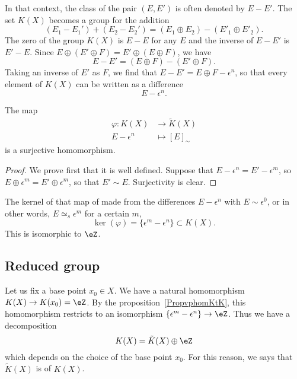 In that context, the class of the pair $(E,E')$ is often denoted by $E-E'$. The set $K(X)$ becomes a group for the addition
\begin{equation}
	(E_1-E_1')+(E_2-E_2')=(E_1\oplus E_2)-(E'_1\oplus E'_2).
\end{equation}
The zero of the group $K(X)$ is $E-E$ for any $E$ and the inverse of $E-E'$ is $E'-E$. Since $E\oplus(E'\oplus F)=E'\oplus(E\oplus F)$, we have
\begin{equation}
	E-E'=(E\oplus F)-(E'\oplus F).
\end{equation}
Taking an inverse of $E'$ as $F$, we find that $E-E'=E\oplus F-\epsilon^n$, so that every element of $K(X)$ can be written as a difference
\[
	E-\epsilon^n.
\]

\begin{proposition}		\label{PropvphomKtK}
	The map
	\begin{equation}
		\begin{aligned}
			\varphi\colon K(X) & \to \tilde K(X)    \\
			E-\epsilon^n       & \mapsto [E]_{\sim}
		\end{aligned}
	\end{equation}
	is a surjective homomorphism.
\end{proposition}

\begin{proof}
	We prove first that it is well defined. Suppose that $E-\epsilon^n=E'-\epsilon^m$, so $E\oplus \epsilon^m=E'\oplus \epsilon^m$, so that $E'\sim E$. Surjectivity is clear.
\end{proof}

The kernel of that map of made from the differences $E-\epsilon^n$ with $E\sim \epsilon^0$, or in other words, $E\simeq_s\epsilon^m$ for a certain $m$,
\begin{equation}
	\ker(\varphi)=\{ \epsilon^m-\epsilon^n \}\subset K(X).
\end{equation}
This is isomorphic to $\eZ$.

\subsection{Reduced group}

Let us fix a base point $x_0\in X$. We have a natural homomorphism $K(X)\to K(x_0)=\eZ$. By the proposition~\ref{PropvphomKtK}, this homomorphism restricts to an isomorphism $\{ \epsilon^m-\epsilon^n \}\to \eZ$. Thus we have a decomposition
\begin{equation}
	K(X)=\tilde K(X)\oplus\eZ
\end{equation}
which depends on the choice of the base point $x_0$. For this reason, we says that $\tilde K(X)$ is  of $K(X)$.

